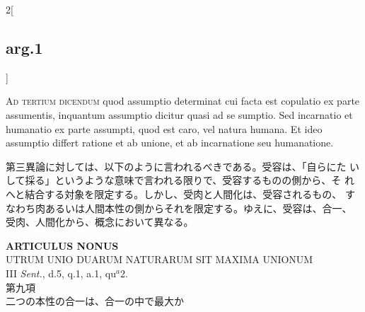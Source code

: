 \documentclass[paper=a4paper,fontsize=10pt,jafontsize=9pt,titlepage]{jlreq}
\begin{document}
\begin{paracol}{2}[\subsection{arg.1}]
\switchcolumn*[\subsection{ad.3}]

{\scshape Ad tertium dicendum} quod assumptio determinat cui facta est
copulatio ex parte assumentis, inquantum assumptio dicitur quasi ad se
sumptio. Sed incarnatio et humanatio ex parte assumpti, quod est caro,
vel natura humana. Et ideo assumptio differt ratione et ab unione, et
ab incarnatione seu humanatione.

\switchcolumn

第三異論に対しては、以下のように言われるべきである。受容は、「自らにた
いして採る」というような意味で言われる限りで、受容するものの側から、そ
れへと結合する対象を限定する。しかし、受肉と人間化は、受容されるもの、
すなわち肉あるいは人間本性の側からそれを限定する。ゆえに、受容は、合一、
受肉、人間化から、概念において異なる。

\end{paracol}
\newpage



{}
\setcounter{section}{9}
\setcounter{subsection}{0}
\begin{center}
{\Large {\bfseries ARTICULUS NONUS}}\\ {\large UTRUM UNIO DUARUM NATURARUM
SIT MAXIMA UNIONUM}\\ {\footnotesize III {\itshape Sent.}, d.5, q.1,
a.1, qu$^a$2.}\\ {\Large 第九項\\二つの本性の合一は、合一の中で最大か}
\end{center}
\end{document}
